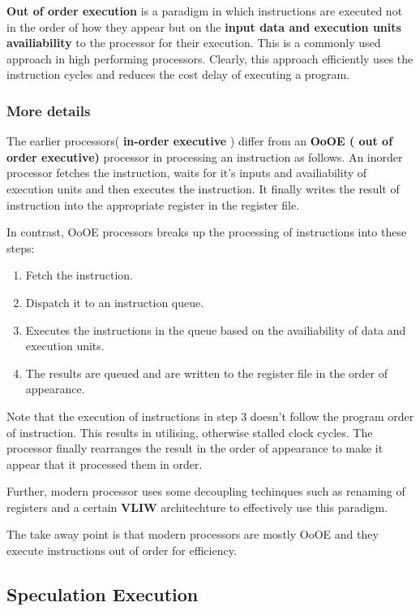 \documentclass[12pt]{article}
\begin{document}
\textbf{Out of order execution} is a paradigm in which instructions are executed not in the order of how they appear but on the \textbf{input data and execution units availiability} to the processor for their execution. This is a commonly used approach in high performing processors. Clearly, this approach efficiently uses the instruction cycles and reduces the cost delay of executing a program.  

\subsubsection{More details}
The earlier processors( \textbf{in-order executive} ) differ from an \textbf{OoOE ( out of order executive)} processor in processing an instruction as follows. An inorder processor fetches the instruction, waits for it's inputs and availiability of execution units and then executes the instruction. It finally writes the result of instruction into the appropriate register in the register file. 

In contrast, OoOE processors breaks up the processing of instructions into these steps:
\begin{enumerate}
	\item Fetch the instruction.
	\item Dispatch it to an instruction queue.
	\item Executes the instructions in the queue based on the availiability of data and execution units.
	\item The results are queued and are written to the register file in the order of appearance.
\end{enumerate}

Note that the execution of instructions in step 3 doesn't follow the program order of instruction. 
This results in utilising, otherwise stalled clock cycles. The processor finally rearranges the result in the order of appearance to make it appear that it processed them in order. 

Further, modern processor uses some decoupling techinques such as renaming of registers and a certain \textbf{VLIW} architechture to effectively use this paradigm.

   The take away point is that modern processors are mostly OoOE and they execute instructions out of order for efficiency. 
  
\subsection{Speculation Execution}
\end{document}
